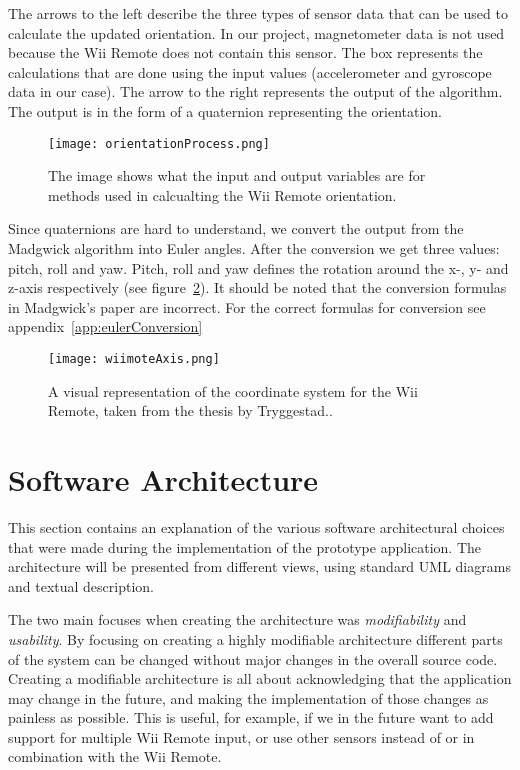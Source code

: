 The arrows to the left describe the three types of sensor data that can be used to calculate the updated orientation. In our project, magnetometer data is not used because the Wii Remote does not contain this sensor. The box represents the calculations that are done using the input values (accelerometer and gyroscope data in our case). The arrow to the right represents the output of the algorithm. The output is in the form of a quaternion representing the orientation.

\begin{figure}[h!]
  \centering
    \texttt{[image: orientationProcess.png]}
    \caption{\footnotesize The image shows what the input and output variables are for methods used in calcualting the Wii Remote orientation.}
    \label{fig:orientationProcess}
\end{figure}

Since quaternions are hard to understand, we convert the output from the Madgwick algorithm into Euler angles. After the conversion we get three values: pitch, roll and yaw. Pitch, roll and yaw defines the rotation around the x-, y- and z-axis respectively (see figure~\ref{fig:wiiAxis}). It should be noted that the conversion formulas in Madgwick’s paper \cite{madgwick} are incorrect. For the correct formulas for conversion see appendix~\ref{app:eulerConversion}

\begin{figure}[h!]
  \centering
    \texttt{[image: wiimoteAxis.png]}
    \caption{\footnotesize A visual representation of the coordinate system for the Wii Remote, taken from the thesis by Tryggestad.\cite{Tryggestad}.}
    \label{fig:wiiAxis}
\end{figure}

\section{Software Architecture}
This section contains an explanation of the various software architectural choices that were made during the implementation of the prototype application. The architecture will be presented from different views, using standard UML diagrams and textual description.

The two main focuses when creating the architecture was \emph{modifiability} and \emph{usability}. By focusing on creating a highly modifiable architecture different parts of the system can be changed without major changes in the overall source code. Creating a modifiable architecture is all about acknowledging that the application may change in the future, and  making the implementation of those changes as painless as possible. This is useful, for example, if we in the future want to add support for multiple Wii Remote input, or use other sensors instead of or in combination with the Wii Remote.

